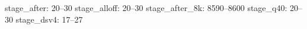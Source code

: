 stage_after: 20--30 stage_alloff: 20--30 stage_after_8k: 8590--8600 stage_q40: 20--30 stage_dsv4: 17--27%
